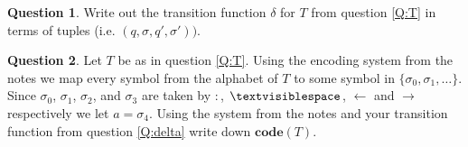 \documentclass{article}
\theoremstyle{definition}
\newtheorem{Q}{Question}
\newcommand{\tvs}{\textvisiblespace}
\newcommand{\ra}{\rightarrow}
\newcommand{\la}{\leftarrow}
\newcommand{\co}{\mathbf{code}}
\begin{document}
\begin{Q}\label{\prefix Q:delta}
Write out the transition function $\delta$ for $T$ from question \ref{Q:T} in terms of tuples (i.e. $(q,\sigma,q',\sigma'))$.
\end{Q}

\begin{Q}
Let $T$ be as in question \ref{Q:T}. Using the encoding system from the notes we map every symbol from the alphabet of $T$ to some symbol in $\{\sigma_0,\sigma_1,\ldots\}$. Since $\sigma_0$, $\sigma_1$, $\sigma_2$, and $\sigma_3$ are taken by $:$, $\tvs$, $\la$ and $\ra$ respectively we let $a=\sigma_4$. Using the system from the notes and your transition function from question \ref{Q:delta} write down $\co(T)$.
\end{Q}

\end{document}
